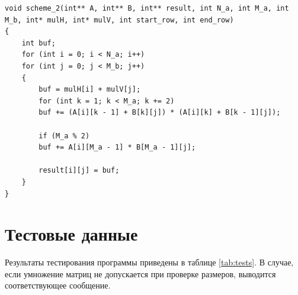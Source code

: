 \documentclass[12pt]{report}
\begin{document}
\newpage

\begin{lstlisting}
void scheme_2(int** A, int** B, int** result, int N_a, int M_a, int M_b, int* mulH, int* mulV, int start_row, int end_row)
{
	int buf;
	for (int i = 0; i < N_a; i++)
	for (int j = 0; j < M_b; j++)
	{
		buf = mulH[i] + mulV[j];
		for (int k = 1; k < M_a; k += 2)
		buf += (A[i][k - 1] + B[k][j]) * (A[i][k] + B[k - 1][j]);
		
		if (M_a % 2)
		buf += A[i][M_a - 1] * B[M_a - 1][j];
		
		result[i][j] = buf;
	}
}
\end{lstlisting}

\section{Тестовые данные}

Результаты тестирования программы приведены в таблице \ref{tab:tests}. В случае, если умножение матриц не допускается при проверке размеров, выводится соответствующее сообщение.
\end{document}
